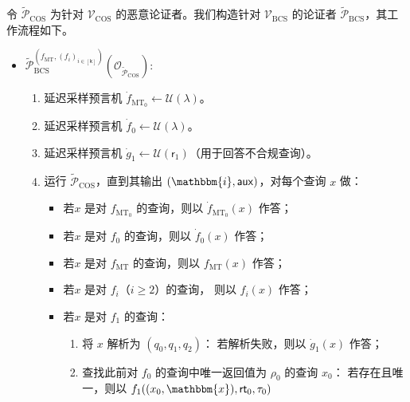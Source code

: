 \documentclass[american,singlepageview]{snargs-book-zh}
\newcommand{\Malicious}[1]{\tilde{#1}}
\newcommand{\AuxiliaryState}{\mathsf{aux}}
\newcommand{\BlackBox}[1]{\mathcal{O}_{#1}}
\newcommand{\Index}{\mathbbm{i}}
\newcommand{\Instance}{\mathbbm{x}}
\newcommand{\ProtoProver}{P}
\newcommand{\ProtoVerifier}{V}
\newcommand{\ProtoSalt}{\tau}
\newcommand{\ProtoRoundComplexity}{\mathsf{k}}
\newcommand{\ProtoRandomnessComplexity}{\mathsf{r}}
\newcommand{\RoundIndex}{i}
\newcommand{\IOPVerifierRandomMessage}{\rho}
\newcommand{\IOPRoundComplexity}{\ProtoRoundComplexity}
\newcommand{\IOPRandomnessComplexity}{\ProtoRandomnessComplexity}
\newcommand{\ARGFormat}[1]{\mathcal{#1}}
\newcommand{\ARGProver}{\ARGFormat{\ProtoProver}}
\newcommand{\ARGVerifier}{\ARGFormat{\ProtoVerifier}}
\newcommand{\IndexRoundSubscript}{0}
\newcommand{\ROFunction}{f}
\newcommand{\RODistribution}[1]{\mathcal{U}(#1)}
\newcommand{\SecurityParameter}{\lambda}
\newcommand{\ROQuery}{x}
\newcommand{\Lazy}[1]{\dot{#1}}
\newcommand{\LazySub}[2]{\Lazy{#1}_{#2}}
\newcommand{\ROFunctionAlt}{g}
\newcommand{\ROTreeSymbol}{\MTSubscript}
\newcommand{\ROTreeFunction}{\ROFunction_{\ROTreeSymbol}}
\newcommand{\RORandRoundFunction}[1]{\ROFunction_{#1}}
\newcommand{\MTSubscript}{{\scriptscriptstyle\mathrm{MT}}}
\newcommand{\MTCommitment}{\mathsf{rt}}
\newcommand{\RandSaltString}{\ProtoSalt}
\newcommand{\HashedIndex}{\IOPVerifierRandomMessage_{\IndexRoundSubscript}}
\newcommand{\BCSSubscript}{\scriptscriptstyle\mathrm{BCS}}
\newcommand{\BCSVerifier}{\ARGVerifier_{\BCSSubscript}}
\newcommand{\COSSubscript}{\scriptscriptstyle\mathrm{COS}}
\newcommand{\COSVerifier}{\ARGVerifier_{\COSSubscript}}
\newcommand{\ROIndexHashFunction}{\ROFunction_{\IndexRoundSubscript}}
\newcommand{\ROIndexTreeFunction}{\ROFunction_{\ROTreeSymbol_{\IndexRoundSubscript}}}
\newcommand{\LazyROIndexHashFunction}{\Lazy{\ROFunction}_{\IndexRoundSubscript}}
\newcommand{\LazyROIndexTreeFunction}{\Lazy{\ROFunction}_{\ROTreeSymbol_{\IndexRoundSubscript}}}
\begin{document}
\begin{construction}
\label{construction:cos-to-bcs}
令 $\Malicious{\ARGProver}_{\COSSubscript}$ 为针对 $\COSVerifier$ 的恶意论证者。我们构造针对 $\BCSVerifier$ 的论证者 $\Malicious{\ARGProver}_{\BCSSubscript}$，其工作流程如下。
\begin{itemize}[noitemsep]
\item[]%
$\Malicious{\ARGProver}_{\BCSSubscript}^{(\ROTreeFunction,(\RORandRoundFunction{\RoundIndex})_{\RoundIndex\in[\IOPRoundComplexity]})}
     (\BlackBox{\Malicious{\ARGProver}_{\COSSubscript}})$:
\begin{enumerate}[nolistsep]
  \item 延迟采样预言机 $\LazyROIndexTreeFunction\gets\RODistribution{\SecurityParameter}$。
  \item 延迟采样预言机 $\LazyROIndexHashFunction\gets\RODistribution{\SecurityParameter}$。
  \item 延迟采样预言机 $\LazySub{\ROFunctionAlt}{1}
        \gets\RODistribution{\IOPRandomnessComplexity_{1}}$（用于回答不合规查询）。
  \item 运行 $\Malicious{\ARGProver}_{\COSSubscript}$，直到其输出 $(\Index,\AuxiliaryState)$，对每个查询 $\ROQuery$ 做：
    \begin{itemize}[noitemsep]
      \item 若$\ROQuery$ 是对 $\ROIndexTreeFunction$ 的查询，则以
            $\LazyROIndexTreeFunction(\ROQuery)$ 作答；
      \item 若$\ROQuery$ 是对 $\ROIndexHashFunction$ 的查询，则以
            $\LazyROIndexHashFunction(\ROQuery)$ 作答；
      \item 若$\ROQuery$ 是对 $\ROTreeFunction$ 的查询，则以
            $\ROTreeFunction(\ROQuery)$ 作答；
      \item 若$\ROQuery$ 是对 $\RORandRoundFunction{\RoundIndex}$（$\RoundIndex\ge2$）的查询，
            则以 $\RORandRoundFunction{\RoundIndex}(\ROQuery)$ 作答；
      \item 若$\ROQuery$ 是对 $\RORandRoundFunction{1}$ 的查询：
        \begin{enumerate}[noitemsep]
          \item 将 $\ROQuery$ 解析为 $(q_0,q_1,q_2)$：
                若解析失败，则以 $\LazySub{\ROFunctionAlt}{1}(\ROQuery)$ 作答；
          \item 查找此前对 $\ROIndexHashFunction$ 的查询中唯一返回值为 $\HashedIndex$ 的查询 $\ROQuery_{0}$：
                若存在且唯一，则以
                $\RORandRoundFunction{1}((\ROQuery_{0},\Instance),\MTCommitment_{0},\RandSaltString_{0})$

\end{enumerate}
\end{itemize}
\end{enumerate}
\end{itemize}
\end{construction}
\end{document}
